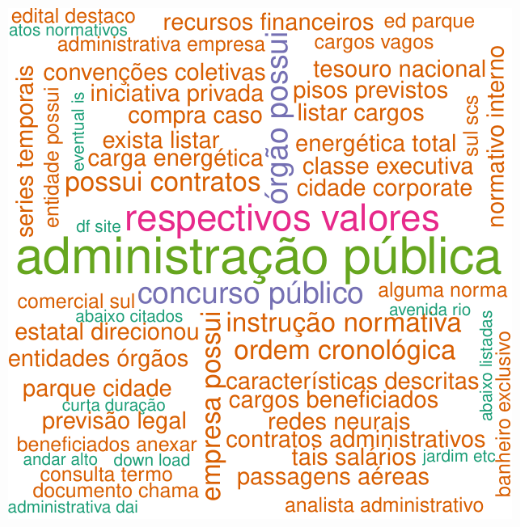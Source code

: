 \documentclass[]{article}
\begin{document}
\includegraphics{markdown_v40_files/figure-latex/wordcloud_bigram_DIR05_semstopwords-1.pdf}
\end{document}

